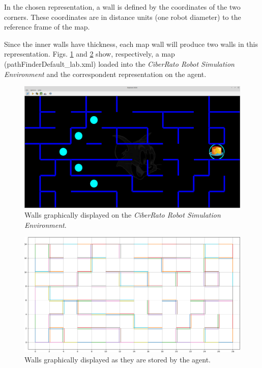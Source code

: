 \documentclass[runningheads]{llncs}
\begin{document}
In the chosen representation, a wall is defined by the coordinates of the two corners. These coordinates are in distance units (one robot diameter) to the reference frame of the map.

Since the inner walls have thickness, each map wall will produce two walls in this representation. Figs. \ref{fig:map_walls_ciberrato} and \ref{fig:map_walls_agent} show, respectively, a map (pathFinderDefault\_lab.xml) loaded into the \emph{CiberRato Robot Simulation Environment} and the correspondent representation on the agent.

\begin{figure}
    \centering
    \includegraphics[width=\textwidth]{imgs/viewer_default_lab.png}
    \caption{Walls graphically displayed on the \emph{CiberRato Robot Simulation Environment}.} 
    \label{fig:map_walls_ciberrato}
\end{figure}
\FloatBarrier

\begin{figure}
    \centering
    \includegraphics[width=\textwidth]{imgs/agent_walls_map.png}
    \caption{Walls graphically displayed as they are stored by the agent.} 
    \label{fig:map_walls_agent}
\end{figure}
\FloatBarrier
\end{document}
